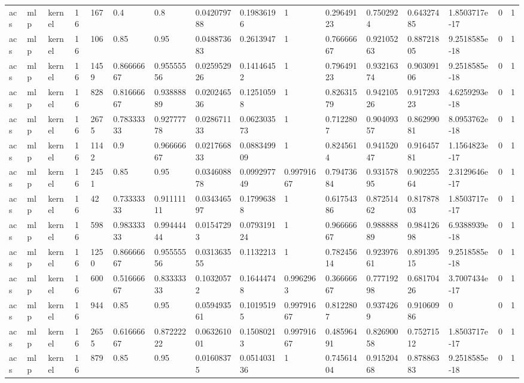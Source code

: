 \begin{tabular}{llllllllllllllll}
acs & mlp & kernel & 16 & 167 & 0.4 & 0.8 & 0.042079788 & 0.19836196 & 1 & 0.29649123 & 0.7502924 & 0.64327485 & 1.8503717e-17 & 0 & 1 \\
acs & mlp & kernel & 16 & 106 & 0.85 & 0.95 & 0.048873683 & 0.2613947 & 1 & 0.76666667 & 0.92105263 & 0.88721805 & 9.2518585e-18 & 0 & 1 \\
acs & mlp & kernel & 16 & 1459 & 0.86666667 & 0.95555556 & 0.025952926 & 0.14146452 & 1 & 0.79649123 & 0.93216374 & 0.90309106 & 9.2518585e-18 & 0 & 1 \\
acs & mlp & kernel & 16 & 828 & 0.81666667 & 0.93888889 & 0.020246536 & 0.12510598 & 1 & 0.82631579 & 0.94210526 & 0.91729323 & 4.6259293e-18 & 0 & 1 \\
acs & mlp & kernel & 16 & 2675 & 0.78333333 & 0.92777778 & 0.028671133 & 0.062303573 & 1 & 0.7122807 & 0.90409357 & 0.86299081 & 8.0953762e-18 & 0 & 1 \\
acs & mlp & kernel & 16 & 1142 & 0.9 & 0.96666667 & 0.021766833 & 0.088349909 & 1 & 0.8245614 & 0.94152047 & 0.91645781 & 1.1564823e-17 & 0 & 1 \\
acs & mlp & kernel & 16 & 2451 & 0.85 & 0.95 & 0.034608878 & 0.099297749 & 0.99791667 & 0.79473684 & 0.93157895 & 0.90225564 & 2.3129646e-17 & 0 & 1 \\
acs & mlp & kernel & 16 & 42 & 0.73333333 & 0.91111111 & 0.034346597 & 0.17996388 & 1 & 0.61754386 & 0.87251462 & 0.81787803 & 1.8503717e-17 & 0 & 1 \\
acs & mlp & kernel & 16 & 598 & 0.98333333 & 0.99444444 & 0.01547293 & 0.079319124 & 1 & 0.96666667 & 0.98888889 & 0.98412698 & 6.9388939e-18 & 0 & 1 \\
acs & mlp & kernel & 16 & 1250 & 0.86666667 & 0.95555556 & 0.031363555 & 0.1132213 & 1 & 0.78245614 & 0.92397661 & 0.89139515 & 9.2518585e-18 & 0 & 1 \\
acs & mlp & kernel & 16 & 600 & 0.51666667 & 0.83333333 & 0.10320572 & 0.16444748 & 0.9962963 & 0.36666667 & 0.77719298 & 0.68170426 & 3.7007434e-17 & 0 & 1 \\
acs & mlp & kernel & 16 & 944 & 0.85 & 0.95 & 0.059493561 & 0.10195195 & 0.99791667 & 0.8122807 & 0.9374269 & 0.91060986 & 0 & 0 & 1 \\
acs & mlp & kernel & 16 & 2655 & 0.61666667 & 0.87222222 & 0.063261001 & 0.15080213 & 0.99791667 & 0.48596491 & 0.82690058 & 0.75271512 & 1.8503717e-17 & 0 & 1 \\
acs & mlp & kernel & 16 & 879 & 0.85 & 0.95 & 0.01608375 & 0.051403136 & 1 & 0.74561404 & 0.91520468 & 0.87886383 & 9.2518585e-18 & 0 & 1 \\

\end{tabular}
